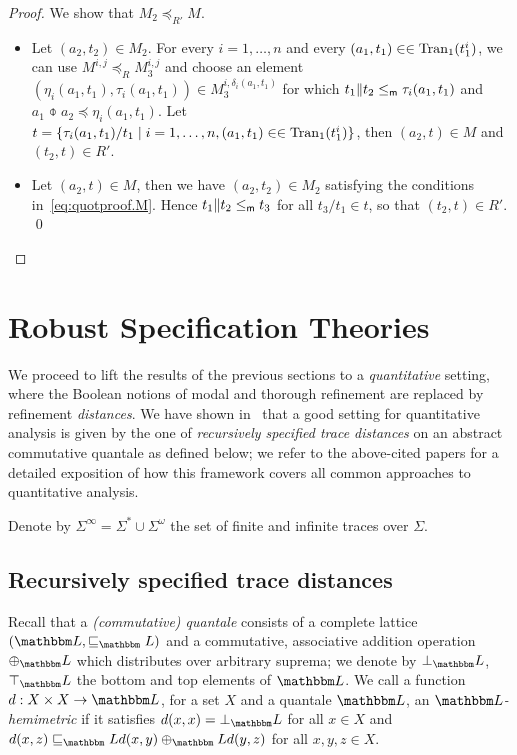\documentclass[twocolumn]{svjour3-dummy}
\newcommand*\labpre{\preccurlyeq}
\newcommand*\mr{\le_\textup{\textsf{m}}}
\newcommand*\Tran{\textup{\textrm{Tran}}}
\newcommand*\by{/}
\newcommand*\LL{\mathbbm L}
\begin{document}
\begin{proof}
  We show that $M_2\labpre_{ R'} M$.
  \begin{itemize}
  \item Let $( a_2, t_2)\in M_2$.  For every $i= 1,\dotsc, n$ and
    every $( a_1, t_1)\in \in \Tran_1( t_1^i)$, we can use $M^{ i,
      j}\labpre_R M_3^{ i, j}$ and choose an element $( \eta_i( a_1,
    t_1), \tau_i( a_1, t_1))\in M_3^{ i, \delta_i( a_1, t_1)}$ for
    which $t_1\| t_2\mr \tau_i(a_1, t_1)$ and $a_1\obar a_2\labpre
    \eta_i( a_1, t_1)$.
    Let $t=\{ \tau_i( a_1, t_1)\by t_1\mid i= 1,\dotsc, n,( a_1, t_1)\in
    \in \Tran_1( t_1^i)\}$, then $( a_2, t)\in M$ and $( t_2, t)\in R'$.
  \item Let $( a_2, t)\in M$, then we have $( a_2, t_2)\in M_2$
    satisfying the conditions in~\eqref{eq:quotproof.M}.  Hence $t_1\|
    t_2\mr t_3$ for all $t_3\by t_1\in t$, so that $( t_2, t)\in
    R'$. \qed
  \end{itemize}
\end{proof}

\section{Robust Specification Theories}
\label{se:quant}

We proceed to lift the results of the previous sections to a
\emph{quantitative} setting, where the Boolean notions of modal and
thorough refinement are replaced by refinement \emph{distances}.  We
have shown in~\cite{DBLP:conf/fsttcs/FahrenbergLT11, DBLP:conf/aplas/FahrenbergL13,
  DBLP:conf/csr/BauerFLT12, DBLP:journals/tcs/FahrenbergL14,
  DBLP:journals/acta/FahrenbergL14} that a good setting for
quantitative analysis is given by the one of \emph{recursively
  specified trace distances} on an abstract commutative quantale as
defined below; we refer to the above-cited papers for a detailed
exposition of how this framework covers all common approaches to
quantitative analysis.

Denote by $\Sigma^\infty= \Sigma^*\cup \Sigma^\omega$ the set of finite
and infinite traces over $\Sigma$.

\subsection{Recursively specified trace distances}

Recall that a \emph{(commutative) quantale} consists of a complete
lattice $( \LL, \sqsubseteq_\LL)$ and a commutative, associative
addition operation $\oplus_\LL$ which distributes over arbitrary
suprema; we denote by $\bot_\LL$, $\top_\LL$ the bottom and top elements
of $\LL$.  We call a function $d: X\times X\to \LL$, for a set $X$ and a
quantale $\LL$, an \emph{$\LL$-hemimetric} if it satisfies $d( x, x)=
\bot_\LL$ for all $x\in X$ and $d( x, z)\sqsubseteq_\LL d( x,
y)\oplus_\LL d( y, z)$ for all $x, y, z\in X$.
\end{document}

